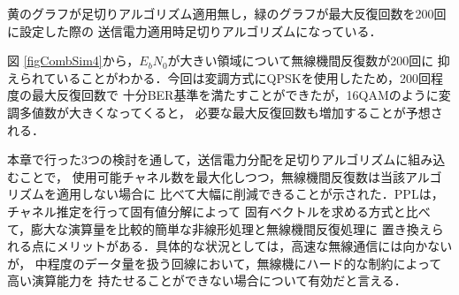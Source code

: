 黄のグラフが足切りアルゴリズム適用無し，緑のグラフが最大反復回数を200回に設定した際の
送信電力適用時足切りアルゴリズムになっている．

図 \ref{figCombSim4}から，$E_bN_0$が大きい領域について無線機間反復数が200回に
抑えられていることがわかる．今回は変調方式にQPSKを使用したため，200回程度の最大反復回数で
十分BER基準を満たすことができたが，16QAMのように変調多値数が大きくなってくると，
必要な最大反復回数も増加することが予想される．

本章で行った3つの検討を通して，送信電力分配を足切りアルゴリズムに組み込むことで，
使用可能チャネル数を最大化しつつ，無線機間反復数は当該アルゴリズムを適用しない場合に
比べて大幅に削減できることが示された．PPLは，チャネル推定を行って固有値分解によって
固有ベクトルを求める方式と比べて，膨大な演算量を比較的簡単な非線形処理と無線機間反復処理に
置き換えられる点にメリットがある．具体的な状況としては，高速な無線通信には向かないが，
中程度のデータ量を扱う回線において，無線機にハード的な制約によって高い演算能力を
持たせることができない場合について有効だと言える．